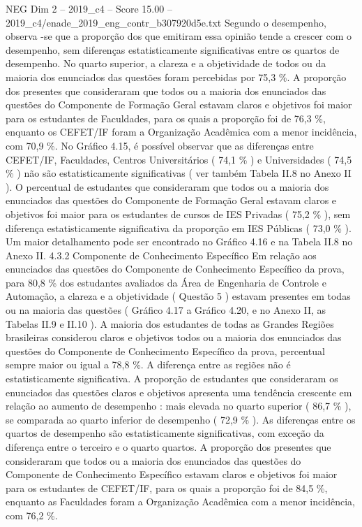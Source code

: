 \begin{textsample}{NEG Dim 2 – 2019\_c4 – Score 15.00 – 2019\_c4/enade\_2019\_eng\_contr\_b307920d5e.txt}
Segundo o desempenho, observa -se que a proporção dos que emitiram essa opinião tende a crescer com o desempenho, sem diferenças estatisticamente significativas entre os quartos de desempenho.
No quarto superior, a clareza e a objetividade de todos ou da maioria dos enunciados das questões foram percebidas por 75,3 \%.
A proporção dos presentes que consideraram que todos ou a maioria dos enunciados das questões do Componente de Formação Geral estavam claros e objetivos foi maior para os estudantes de Faculdades, para os quais a proporção foi de 76,3 \%, enquanto os CEFET/IF foram a Organização Acadêmica com a menor incidência, com 70,9 \%.
No Gráfico 4.15, é possível observar que as diferenças entre CEFET/IF, Faculdades, Centros Universitários ( 74,1 \% ) e Universidades ( 74,5 \% ) não são estatisticamente significativas ( ver também Tabela II.8 no Anexo II ).
O percentual de estudantes que consideraram que todos ou a maioria dos enunciados das questões do Componente de Formação Geral estavam claros e objetivos foi maior para os estudantes de cursos de IES Privadas ( 75,2 \% ), sem diferença estatisticamente significativa da proporção em IES Públicas ( 73,0 \% ).
Um maior detalhamento pode ser encontrado no Gráfico 4.16 e na Tabela II.8 no Anexo II. 4.3.2 Componente de Conhecimento Específico Em relação aos enunciados das questões do Componente de Conhecimento Específico da prova, para 80,8 \% dos estudantes avaliados da Área de Engenharia de Controle e Automação, a clareza e a objetividade ( Questão 5 ) estavam presentes em todas ou na maioria das questões ( Gráfico 4.17 a Gráfico 4.20, e no Anexo II, as Tabelas II.9 e II.10 ).
A maioria dos estudantes de todas as Grandes Regiões brasileiras considerou claros e objetivos todos ou a maioria dos enunciados das questões do Componente de Conhecimento Específico da prova, percentual sempre maior ou igual a 78,8 \%.
A diferença entre as regiões não é estatisticamente significativa.
A proporção de estudantes que consideraram os enunciados das questões claros e objetivos apresenta uma tendência crescente em relação ao aumento de desempenho : mais elevada no quarto superior ( 86,7 \% ), se comparada ao quarto inferior de desempenho ( 72,9 \% ).
As diferenças entre os quartos de desempenho são estatisticamente significativas, com exceção da diferença entre o terceiro e o quarto quartos.
A proporção dos presentes que consideraram que todos ou a maioria dos enunciados das questões do Componente de Conhecimento Específico estavam claros e objetivos foi maior para os estudantes de CEFET/IF, para os quais a proporção foi de 84,5 \%, enquanto as Faculdades foram a Organização Acadêmica com a menor incidência, com 76,2 \%.

\end{textsample}

